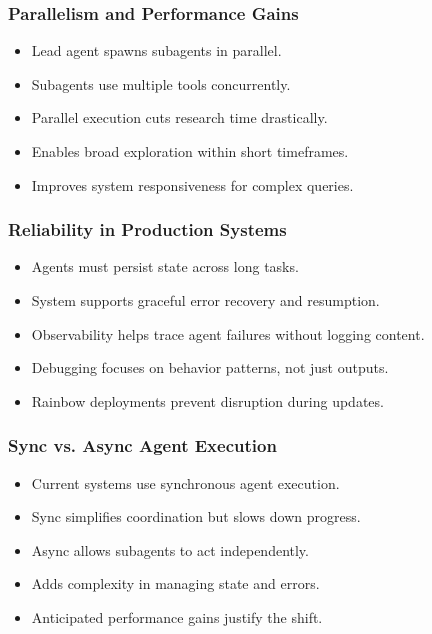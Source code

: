 \begin{frame}[fragile]\frametitle{Parallelism and Performance Gains}
    \begin{itemize}
        \item Lead agent spawns subagents in parallel.
        \item Subagents use multiple tools concurrently.
        \item Parallel execution cuts research time drastically.
        \item Enables broad exploration within short timeframes.
        \item Improves system responsiveness for complex queries.
    \end{itemize}
\end{frame}

\begin{frame}[fragile]\frametitle{Reliability in Production Systems}
    \begin{itemize}
        \item Agents must persist state across long tasks.
        \item System supports graceful error recovery and resumption.
        \item Observability helps trace agent failures without logging content.
        \item Debugging focuses on behavior patterns, not just outputs.
        \item Rainbow deployments prevent disruption during updates.
    \end{itemize}
\end{frame}

\begin{frame}[fragile]\frametitle{Sync vs. Async Agent Execution}
    \begin{itemize}
        \item Current systems use synchronous agent execution.
        \item Sync simplifies coordination but slows down progress.
        \item Async allows subagents to act independently.
        \item Adds complexity in managing state and errors.
        \item Anticipated performance gains justify the shift.
    \end{itemize}
\end{frame}

